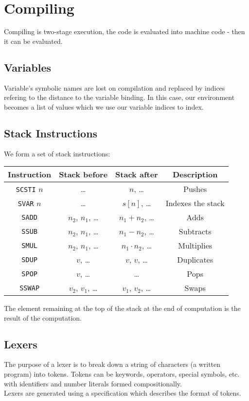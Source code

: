 \section{Compiling}

Compiling is two-stage execution, the code is evaluated
into machine code - then it can be evaluated.

\subsection{Variables}

Variable's symbolic names are lost on compilation and 
replaced by indices refering to the distance to the variable
binding. In this case, our environment becomes a list of values
which we use our variable indices to index.

\subsection{Stack Instructions}

We form a set of stack instructions:
\begin{center}
    \begin{tabular}{| c | c | c | c |}
        \hline
        Instruction & Stack before & Stack after & Description \\
        \hline \hline
        \texttt{SCSTI} $n$ & \ldots               & $n$, \ldots             & Pushes \\
        \hline
        \texttt{SVAR} $n$  & \ldots               & $s[n]$, \ldots          & Indexes the stack \\
        \hline
        \texttt{SADD}      & $n_2$, $n_1$, \ldots & $n_1 + n_2$, \ldots     & Adds \\
        \hline
        \texttt{SSUB}      & $n_2$, $n_1$, \ldots & $n_1 - n_2$, \ldots     & Subtracts \\
        \hline
        \texttt{SMUL}      & $n_2$, $n_1$, \ldots & $n_1 \cdot n_2$, \ldots & Multiplies \\
        \hline
        \texttt{SDUP}      & $v$, \ldots          & $v$, $v$, \ldots        & Duplicates \\
        \hline
        \texttt{SPOP}      & $v$, \ldots          & \ldots                  & Pops \\
        \hline
        \texttt{SSWAP}     & $v_2$, $v_1$, \ldots & $v_1$, $v_2$, \ldots    & Swaps \\
        \hline
    \end{tabular}
\end{center} The element remaining at the top of the stack at
the end of computation is the result of the computation.

\subsection{Lexers}

The purpose of a lexer is to break down a string of characters (a written
program) into tokens. Tokens can be keywords, operators, special symbols, etc.
with identifiers and number literals formed compositionally.
\\[\baselineskip]
Lexers are generated using a specification which describes the format of
tokens.

